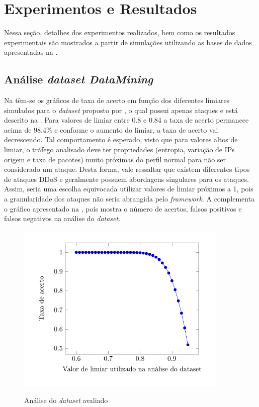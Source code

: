 \chapter[Resultados]{Experimentos e Resultados}
\label{resultados}
Nessa seção, detalhes dos experimentos realizados, bem como os resultados experimentais são mostrados a partir de simulações utilizando as bases de dados apresentadas na .

\section{Análise \textit{dataset DataMining}}  
Na  têm-se os gráficos de taxa de acerto em função dos diferentes limiares simulados para o \textit{dataset} proposto por \cite{DataMining}, o qual possui apenas ataques e está descrito na . Para valores de limiar entre 0.8 e 0.84 a taxa de acerto permanece acima de 98.4\% e conforme o aumento do limiar, a taxa de acerto vai decrescendo. Tal comportamento é esperado, visto que para valores altos de limiar, o tráfego analisado deve ter propriedades (entropia, variação de IPs origem e taxa de pacotes) muito próximas do perfil normal para não ser considerado um ataque. Desta forma, vale ressaltar que existem diferentes tipos de ataques DDoS e geralmente possuem abordagens singulares para os ataques. Assim, seria uma escolha equivocada utilizar valores de limiar próximos a 1, pois a granularidade dos ataques não seria abrangida pelo \textit{framework}. A  complementa o gráfico apresentado na , pois mostra o número de acertos, falsos positivos e falsos negativos na análise do \textit{dataset}.

 \begin{figure}[htb]
 	\centering
 	\caption{Análise do \textit{dataset} avaliado }
 	\includegraphics[width=0.9\textwidth]{figs/results80-95Mining.pdf}\\
 	\hspace{1.5cm}{Fonte: Elaborada pelo autor.}
 	\label{fig:ResultsMining}
 \end{figure}
 
